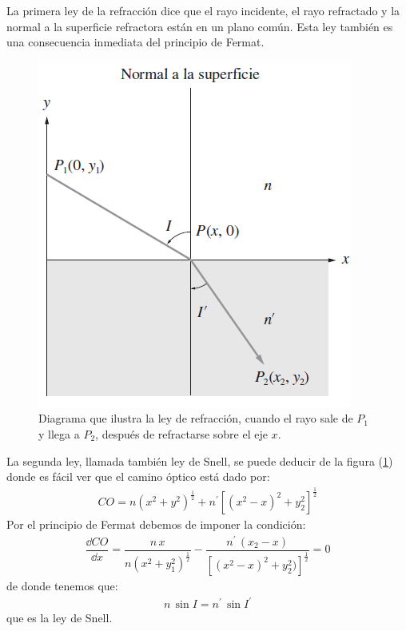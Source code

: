 \documentclass[14pt]{extarticle}
\begin{document}
La primera ley de la refracción dice que el rayo incidente, el rayo refractado y la normal a la superficie refractora están en un plano común. Esta ley también es una consecuencia inmediata del principio de Fermat.
\begin{figure}[H]
\centering
\includegraphics[scale=0.75]{Imagenes/Optica_Geometrica_04.png}
\caption{Diagrama que ilustra la ley de refracción, cuando el rayo sale de $P_{1}$ y llega a $P_{2}$, después de refractarse sobre el eje $x$.}
\label{fig:figura_04}
\end{figure}
La segunda ley, llamada también ley de Snell, se puede deducir de la figura (\ref{fig:figura_04}) donde es fácil ver que el camino óptico está dado por:
\begin{align}
CO = n (x^{2} + y^{2})^{\frac{1}{2}} + n^{\prime} \left[ (x^{2} - x)^{2} + y_{2}^{2} \right]^{\frac{1}{2}}
\label{eq:ecuacion_I_08}
\end{align}
Por el principio de Fermat debemos de imponer la condición:
\begin{align}
\dfrac{\dd{CO}}{\dd{x}} = \dfrac{n \, x}{n (x^{2} + y_{1}^{2})^{\frac{1}{2}}} - \dfrac{n^{\prime} \,(x_{2} - x)}{ \left[ (x^{2} - x)^{2} + y_{2}^{2}) \right]^{\frac{1}{2}}} = 0
\label{eq:ecuacion_I_09} 
\end{align}
de donde tenemos que:
\begin{align}
n \, \sin I = n^{\prime} \, \sin I^{\prime}
\label{eq:ecuacion_I_10}
\end{align}
que es la ley de Snell.
\end{document}
